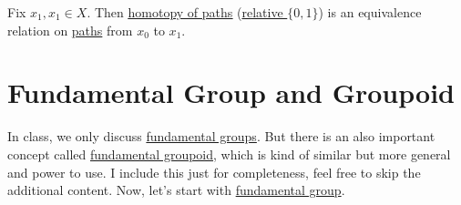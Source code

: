 \begin{exercise}
	Fix \(x_1, x_1\in X\). Then \hyperref[def:homotopy-path]{\underline{homotopy of paths}} (\hyperref[def:homotopy-relative]{relative \(\{0, 1\}\)}) is an
	equivalence relation on \hyperref[def:path]{paths} from \(x_0\) to \(x_1\).
\end{exercise}

\section{Fundamental Group and Groupoid}
In class, we only discuss \hyperref[def:fundamental-group]{fundamental groups}. But there is an also important concept called
\hyperref[def:fundamental-groupoid]{fundamental groupoid}, which is kind of similar but more general and power to use. I include
this just for completeness, feel free to skip the additional content. Now, let's start with \hyperref[def:fundamental-group]{fundamental group}.

